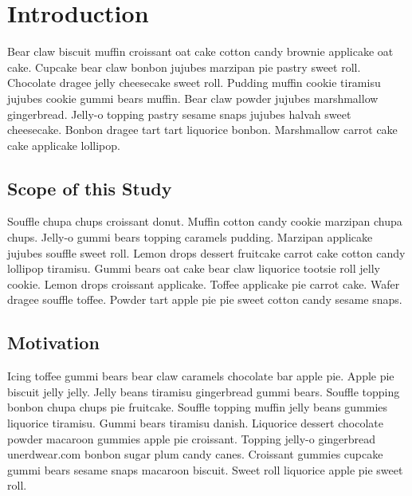 
\graphicspath{{1/figures/}}

\chapter{Introduction}
\label{chp:introduction}

Bear claw biscuit muffin croissant oat cake cotton candy brownie applicake oat cake. Cupcake bear claw bonbon jujubes marzipan pie pastry sweet roll. Chocolate dragee jelly cheesecake sweet roll. Pudding muffin cookie tiramisu jujubes cookie gummi bears muffin. Bear claw powder jujubes marshmallow gingerbread. Jelly-o topping pastry sesame snaps jujubes halvah sweet cheesecake. Bonbon dragee tart tart liquorice bonbon. Marshmallow carrot cake cake applicake lollipop.

\section{Scope of this Study}
\label{sec:scope}

Souffle chupa chups croissant donut. Muffin cotton candy cookie marzipan chupa chups. Jelly-o gummi bears topping caramels pudding. Marzipan applicake jujubes souffle sweet roll. Lemon drops dessert fruitcake carrot cake cotton candy lollipop tiramisu. Gummi bears oat cake bear claw liquorice tootsie roll jelly cookie. Lemon drops croissant applicake. Toffee applicake pie carrot cake. Wafer dragee souffle toffee. Powder tart apple pie pie sweet cotton candy sesame snaps.

\section{Motivation}

Icing toffee gummi bears bear claw caramels chocolate bar apple pie. Apple pie biscuit jelly jelly. Jelly beans tiramisu gingerbread gummi bears. Souffle topping bonbon chupa chups pie fruitcake. Souffle topping muffin jelly beans gummies liquorice tiramisu. Gummi bears tiramisu danish. Liquorice dessert chocolate powder macaroon gummies apple pie croissant. Topping jelly-o gingerbread unerdwear.com bonbon sugar plum candy canes. Croissant gummies cupcake gummi bears sesame snaps macaroon biscuit. Sweet roll liquorice apple pie sweet roll.

